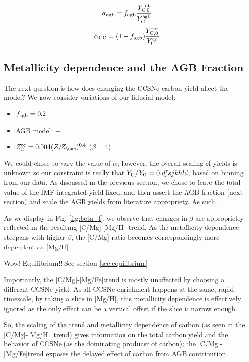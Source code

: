 \documentclass[fleqn,usenatbib]{mnras}
\newcommand{\cristallo}{\citetalias{cristallo+11}+\citetalias{cristallo+15}}
\newcommand{\caah}{[C/Mg]-[Mg/H]}
\newcommand{\caafe}{[C/Mg]-[Mg/Fe]}
\newcommand{\Ycc}{\ensuremath{Y_{\rm C}^{\rm cc}}}
\newcommand{\Yct}{\ensuremath{Y_{\rm C, 0}^{\rm tot}}}
\newcommand{\Ycagb}{\ensuremath{Y_{\rm C}^{\rm agb}}}
\begin{document}
\begin{equation}
    \alpha_{\rm agb} = f_{\rm agb} \frac{\Yct}{\Ycagb}
\end{equation}
\begin{equation}
    \alpha_{\rm CC} = (1 - f_{\rm agb}) \frac{\Yct}{\Ycc}
\end{equation}

\subsection{Metallicity dependence and the AGB Fraction}
The next question is how does changing the CCSNe carbon yield affect the model?
We now consider variations of our fiducial model:
\begin{itemize}
    \item $f_{\rm agb} = 0.2$
    \item AGB model: \cristallo
    \item $Z_{\rm C}^{\rm cc} = 0.004 (Z/Z_{\sun })^{0.4}$ ($\beta = 4$)
\end{itemize}

We could chose to vary the value of $\alpha$; however, the overall scaling of
yields is unknown so our constraint is really that $Y_{\rm C}/Y_{\rm O} =
0.dfsjkhld$, based on binning from our data. As discussed in the previous
section, we chose to leave the total value of the IMF integrated yield fixed,
and then assert the AGB fraction (next section) and scale the AGB yields from
literature appropriety. As such, 

As we display in Fig. \ref{fig:beta_f}, we observe that changes in $\beta$ are
approprietly reflected in the resulting \caah~trend. As the metallicity
dependence steepens with higher $\beta$, the [C/Mg] ratio becomes
correspondingly more dependent on [Mg/H].

Wow! Equilibrium!! See section \ref{sec:equilibrium}

Importantly, the \caafe trend is mostly unaffected by choosing a different
CCSNe yield. As all CCSNe enrichment happens at the same, rapid timescale, by
taking a slice in [Mg/H], this metallicity dependence is effectively ignored as
the only effect can be a vertical offset if the slice is narrow enough. 

So, the scaling of the trend and metallicity dependence of carbon (as seen in
the \caah~trend) gives information on the total carbon yield and the behavior
of CCSNe (as the dominating producer of carbon);
the \caafe trend exposes the delayed effect of carbon from AGB contribution.
\end{document}

